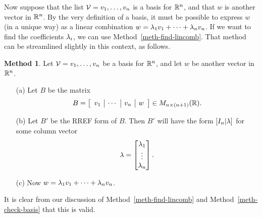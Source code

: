 \documentclass[reqno]{amsart}
\theoremstyle{definition}
\newtheorem{method}[theorem]{Method}
\begin{document}
Now suppose that the list $\mathcal{V}=v_1,\dotsc,v_n$ is a basis for ${\mathbb{R}}^n$,
and that $w$ is another vector in ${\mathbb{R}}^n$.  By the very definition of a
basis, it must be possible to express $w$ (in a unique way) as a
linear combination $w=\lambda_1v_1+\dotsb+\lambda_nv_n$.  If we want to find
the coefficients $\lambda_i$, we can use Method~\ref{meth-find-lincomb}.
That method can be streamlined slightly in this context, as follows.

\begin{method}\label{meth-find-lincomb-basis}
 Let $\mathcal{V}=v_1,\dotsc,v_n$ be a basis for ${\mathbb{R}}^n$, and let $w$ be
 another vector in ${\mathbb{R}}^n$.
 \begin{itemize}
  \item[(a)] Let $B$ be the matrix
   \[ B = \left[\begin{array}{c|c|c|c}
       v_1 & \cdots & v_n & w
      \end{array}\right] \in M_{n\times (n+1)}({\mathbb{R}}).
   \]
  \item[(b)] Let $B'$ be the RREF form of $B$.  Then $B'$ will have
   the form $[I_n|\lambda]$ for some column vector
   \[ \lambda = \left[\begin{matrix} \lambda_1 \\ \vdots \\ \lambda_n \end{matrix}\right]. \]
  \item[(c)] Now $w=\lambda_1v_1+\dotsb+\lambda_nv_n$.
 \end{itemize}
\end{method}
It is clear from our discussion  of Method~\ref{meth-find-lincomb} and
Method~\ref{meth-check-basis} that this is valid.
\end{document}
